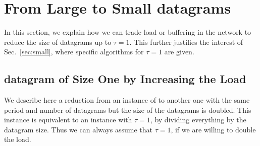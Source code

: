 \section{From Large to Small datagrams}\label{sec:reduction}

In this section, we explain how we can trade load or buffering in the network to reduce the size of datagrams up to $\tau = 1$. This further justifies the interest of Sec.~\ref{sec:small}, where specific algorithms for $\tau = 1$ are given.

\subsection{datagram of Size One by Increasing the Load}

We describe here a reduction from an instance of \pma to another one with the same period and number of datagrams but 
the size of the datagrams is doubled. This instance is equivalent to an instance with $\tau = 1$, by dividing everything by the datagram size. Thus we can always assume that $\tau = 1$, if we are willing to double the load.


